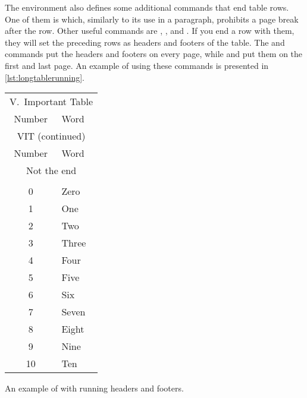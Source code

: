 The  environment also defines some additional commands that end
table rows. One of them is  which, similarly to its
use in a paragraph, prohibits a page break after the row. Other useful commands
are , ,  and . If
you end a row with them, they will set the preceding rows as headers and
footers of the table. The  and  commands put the
headers and footers on every page, while  and
 put them on the first and last page. An example of using these
commands is presented in \autoref{lst:longtablerunning}.
\begin{listing}
  \begin{example}[
    standalone,
    to_page=2,
    paperwidth=4.3cm,
    paperheight=5cm,
    examplewidth=8.7cm,
    vertical_mode,
  ]
\usepackage{longtable}
\usepackage{booktabs}

\begin{longtable}{cl}
  \toprule
  \multicolumn{2}{c}{V.~Important Table} \\
  Number & Word                           \\
  \midrule \endfirsthead

  \toprule
  \multicolumn{2}{c}{VIT (continued)}    \\
  Number & Word                          \\
  \midrule \endhead

  \midrule
  \multicolumn{2}{c}{Not the end}        \\
  \bottomrule \endfoot

  \midrule
  \multicolumn{2}{c}{The end of VIT}     \\
  \bottomrule \endlastfoot

  0      & Zero   \\
  1      & One    \\
  2      & Two     \\
  3      & Three \\
  4      & Four  \\
  5      & Five  \\
  6      & Six   \\
  7      & Seven \\
  8      & Eight \\
  9      & Nine  \\
  10     & Ten    \\
\end{longtable}
\end{example}
  \caption{An example of  with running headers and
    footers.}\label{lst:longtablerunning}
\end{listing}

